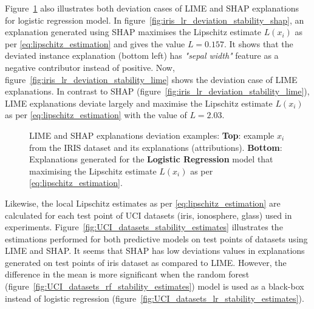 \documentclass[english]{tktltiki2}
\theoremstyle{definition}
\theoremstyle{remark}
\begin{document}
Figure~\ref{fig:iris_lr_deviation_stability} also illustrates both deviation cases of LIME and SHAP explanations for logistic regression model. In figure~\ref{fig:iris_lr_deviation_stability_shap}, an explanation generated using SHAP maximises the Lipschitz estimate $L(x_i)$ as per \eqref{eq:lipschitz_estimation} and gives the value $L=0.157$. It shows that the deviated instance explanation (bottom left) has \textit{"sepal width"} feature as a negative contributor instead of positive. Now, figure~\ref{fig:iris_lr_deviation_stability_lime} shows the deviation case of LIME explanations. In contrast to SHAP (figure~\ref{fig:iris_lr_deviation_stability_lime}), LIME explanations deviate largely and maximise the Lipschitz estimate $L(x_i)$ as per \eqref{eq:lipschitz_estimation} with the value of $L=2.03$. 

\begin{figure}[H]
	\hspace*{\fill}%
	\caption{LIME and SHAP explanations deviation examples: \textbf{Top}: example $x_i$ from the IRIS dataset and its explanations (attributions). \textbf{Bottom}: Explanations generated for the \textbf{Logistic Regression} model that maximising the Lipschitz estimate $L(x_i)$ as per \eqref{eq:lipschitz_estimation}.}%
	\label{fig:iris_lr_deviation_stability}%
\end{figure}



Likewise, the local Lipschitz estimates as per \eqref{eq:lipschitz_estimation} are calculated for each test point of UCI datasets (iris, ionosphere, glass) used in experiments. Figure~\ref{fig:UCI_datasets_stability_estimates} illustrates the estimations performed for both predictive models on test points of datasets using LIME and SHAP. It seems that SHAP has low deviations values in explanations generated on test points of iris dataset as compared to LIME. However, the difference in the mean is more significant when the random forest (figure~\ref{fig:UCI_datasets_rf_stability_estimates}) model is used as a black-box instead of logistic regression (figure~\ref{fig:UCI_datasets_lr_stability_estimates}).
\end{document}
